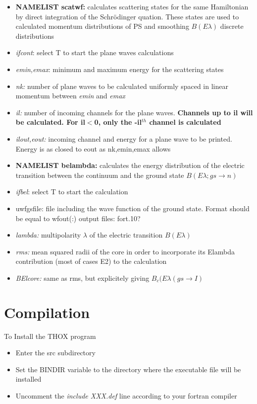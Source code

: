 \documentclass[preprint,12pt]{elsarticle}
\begin{document}
\begin{itemize}
\item \textbf{NAMELIST scatwf:} calculates scattering states for the same Hamiltonian by direct integration of the Schr\"odinger quation. These states are used to calculated momentum distributions of PS and  smoothing $B(E\lambda)$ discrete distributions
\bi
\item {\it ifcont}: select T to start the plane waves calculations
\item {\it emin,emax}: minimum and maximum energy for the scattering states
\item {\it nk:} number of plane waves to be calculated uniformly spaced in linear momentum between {\it emin} and {\it emax}
\item {\it il:} number of incoming channels for the plane waves. \textbf{Channels up to il will be calculated. For il$<$0, only the -il$^{th}$ channel is calculated}
\item {\it ilout,eout:} incoming channel and energy for a plane wave to be printed. Energy is as closed to eout as nk,emin,emax allows
\ei

\item \textbf{NAMELIST belambda:} calculates the energy distribution of the electric transition between the continuum and the ground state  $B(E\lambda;gs \rightarrow n)$
\bi
\item {\it ifbel}: select T to start the calculation
\item uwfgsfile: file including the wave function of the ground state. Format should be equal to wfout(:) output files: fort.10?
\item {\it lambda:} multipolarity $\lambda$ of the electric transition $B(E\lambda)$ 
\item {\it rms:} mean squared radii of the core in order to incorporate its Elambda contribution (most of cases E2) to the calculation
\item {\it BElcore:} same as rms, but explicitely giving $B_c(E\lambda(gs \rightarrow I)$
\ei
\end{itemize}

\section{Compilation}
To Install the THOX program
\begin{itemize}
\item
Enter the src subdirectory
\item
Set the BINDIR variable to the directory where the executable file
will be installed
\item
Uncomment the {\em include XXX.def} line according to your fortran compiler
\end{itemize}
\end{document}
